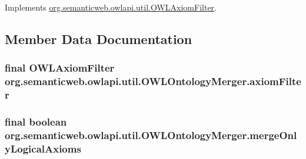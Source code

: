 Implements \hyperlink{interfaceorg_1_1semanticweb_1_1owlapi_1_1util_1_1_o_w_l_axiom_filter_a28fc5d9778f5f3f31cd84cebdf576276}{org.\-semanticweb.\-owlapi.\-util.\-O\-W\-L\-Axiom\-Filter}.



\subsection{Member Data Documentation}
\hypertarget{classorg_1_1semanticweb_1_1owlapi_1_1util_1_1_o_w_l_ontology_merger_aeda588ad8f414ac7d785f53d5c3a59dd}{
\subsubsection[{axiom\-Filter}]{\setlength{\rightskip}{0pt plus 5cm}final {\bf O\-W\-L\-Axiom\-Filter} org.\-semanticweb.\-owlapi.\-util.\-O\-W\-L\-Ontology\-Merger.\-axiom\-Filter\hspace{0.3cm}{\ttfamily [private]}}}\label{classorg_1_1semanticweb_1_1owlapi_1_1util_1_1_o_w_l_ontology_merger_aeda588ad8f414ac7d785f53d5c3a59dd}
\hypertarget{classorg_1_1semanticweb_1_1owlapi_1_1util_1_1_o_w_l_ontology_merger_afbd869e4ce6ccd3aa4bb0692c7f2c7b4}{
\subsubsection[{merge\-Only\-Logical\-Axioms}]{\setlength{\rightskip}{0pt plus 5cm}final boolean org.\-semanticweb.\-owlapi.\-util.\-O\-W\-L\-Ontology\-Merger.\-merge\-Only\-Logical\-Axioms\hspace{0.3cm}{\ttfamily [private]}}}\label{classorg_1_1semanticweb_1_1owlapi_1_1util_1_1_o_w_l_ontology_merger_afbd869e4ce6ccd3aa4bb0692c7f2c7b4}
